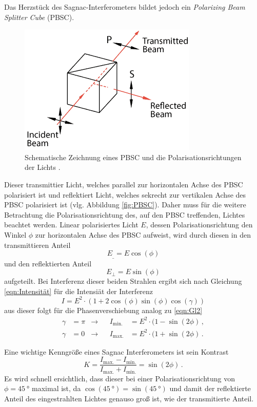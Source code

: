 Das Herzstück des Sagnac-Interferometers bildet jedoch ein \textit{Polarizing Beam Splitter Cube} (PBSC).
\begin{figure}
\includegraphics[width = .3\textwidth]{bilder/sketch-polarizing-cube-beamsplitter.png}
\caption{Schematische Zeichnung eines PBSC und die Polarisationsrichtungen der Lichts \cite{PBSC}.}
\end{figure}
Dieser transmittier Licht, welches parallel zur horizontalen Achse des PBSC polarisiert ist und reflektiert Licht, welches sekrecht zur vertikalen Achse des PBSC polarisiert ist (vlg. Abbildung \ref{fig:PBSC}).
Daher muss für die weitere Betrachtung die Polarisationsrichtung des, auf den PBSC treffenden, Lichtes beachtet werden.
Linear polarisiertes Licht $E$, dessen Polarisationsrichtung den Winkel $\phi$ zur horizontalen Achse des PBSC aufweist, wird durch diesen in den transmittieren Anteil
\begin{equation*}
  E_{\_} = E \cos(\phi)
\end{equation*}
und den reflektierten Anteil
\begin{equation*}
  E_{\bot} = E \sin(\phi)
\end{equation*}
aufgeteilt.
\medskip
Bei Interferenz dieser beiden Strahlen ergibt sich nach Gleichung \eqref{eqn:Intensität} für die Intensiät der Interferenz
\begin{equation*}
  I = E^2 \cdot (1 + 2 \cos(\phi) \sin(\phi) \cos(\gamma))
\end{equation*}
aus dieser folgt für die Phasenverschiebung analog zu \eqref{eqn:Gl2}
\begin{equation}  \label{eqn:Gl3}
  \begin{aligned}
  \gamma &= \pi &\rightarrow& &I_\text{min.} &= E^2 \cdot (1 − \sin(2\phi) \, , \\
  \gamma &= 0 &\rightarrow& &I_\text{max.} &= E^2 \cdot (1 + \sin(2\phi) \, .
\end{aligned}
\end{equation}

Eine wichtige Kenngröße eines Sagnac Interferometers ist sein Kontrast
\begin{equation}
  K = \frac{I_\text{max.} - I_\text{min.}}{I_\text{max.} + I_\text{min.}} = \sin(2\phi) \, .
  \label{eqn:Kontrast}
\end{equation}
Es wird schnell ersichtlich, dass dieser bei einer Polarisationsrichtung von $\phi = \SI{45}{\degree}$ maximal ist, da $\cos(\SI{45}{\degree}) = \sin(\SI{45}{\degree})$ und damit der reflektierte Anteil des eingestrahlten Lichtes genauso groß ist, wie der transmitierte Anteil.


